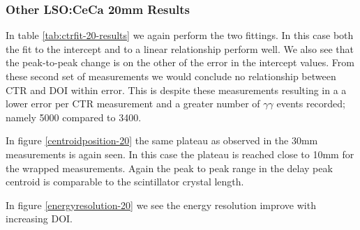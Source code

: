 \subsubsection{Other LSO:CeCa 20mm Results}
In table \ref{tab:ctrfit-20-results} we again perform the two fittings. In this case both the fit to the intercept and to a linear relationship perform well. We also see that the peak-to-peak change is on the other of the error in the intercept values. From these second set of measurements we would conclude no relationship between CTR and DOI within error. This is despite these measurements resulting in a a lower error per CTR measurement and a greater number of $\gamma\gamma$ events recorded; namely 5000 compared to 3400.

In figure \ref{centroidposition-20} the same plateau as observed in the 30mm measurements is again seen. In this case the plateau is reached close to 10mm for the wrapped measurements. Again the peak to peak range in the delay peak centroid is comparable to the scintillator crystal length.

In figure \ref{energyresolution-20} we see the energy resolution improve with increasing DOI. 